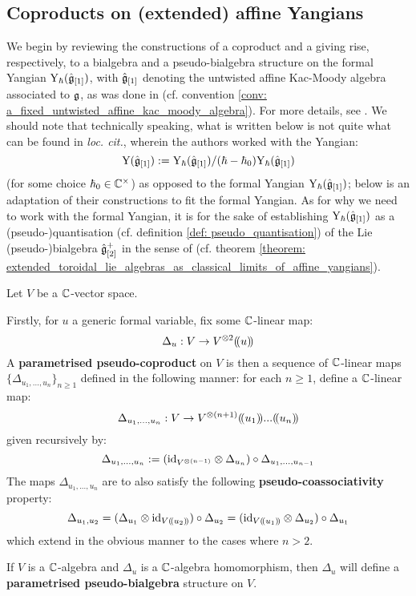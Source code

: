         \subsection{Coproducts on (extended) affine Yangians}
            We begin by reviewing the constructions of a coproduct and a  giving rise, respectively, to a bialgebra and a pseudo-bialgebra structure on the formal Yangian $\mathrm{Y}_{\hbar}(\hat{\mathfrak{g}}_{[1]})$, with $\hat{\mathfrak{g}}_{[1]}$ denoting the untwisted affine Kac-Moody algebra associated to $\mathfrak{g}$, as was done in \cite[Cahpter 7]{kac_infinite_dimensional_lie_algebras} (cf. convention \ref{conv: a_fixed_untwisted_affine_kac_moody_algebra}). For more details, see \cite[Sections 4, 5, and 6]{guay_nakajima_wendlandt_affine_yangian_coproduct}. We should note that technically speaking, what is written below is not quite what can be found in \textit{loc. cit.}, wherein the authors worked with the Yangian:
                $$\mathrm{Y}(\hat{\mathfrak{g}}_{[1]}) := \mathrm{Y}_{\hbar}(\hat{\mathfrak{g}}_{[1]})/(\hbar - \hbar_0)\mathrm{Y}_{\hbar}(\hat{\mathfrak{g}}_{[1]})$$
            (for some choice $\hbar_0 \in \bbC^{\x}$) as opposed to the formal Yangian $\mathrm{Y}_{\hbar}(\hat{\mathfrak{g}}_{[1]})$; below is an adaptation of their constructions to fit the formal Yangian. As for why we need to work with the formal Yangian, it is for the sake of establishing $\mathrm{Y}_{\hbar}(\hat{\mathfrak{g}}_{[1]})$ as a (pseudo-)quantisation (cf. definition \ref{def: pseudo_quantisation}) of the Lie (pseudo-)bialgebra $\hat{\mathfrak{g}}_{[2]}^+$ in the sense of \cite{etingof_kazhdan_quantisation_1} (cf. theorem \ref{theorem: extended_toroidal_lie_algebras_as_classical_limits_of_affine_yangians}). 
        
            \begin{definition} \label{def: parametrised_pseudo_coproducts}
                Let $V$ be a $\mathbb{C}$-vector space. 

                Firstly, for $u$ a generic formal variable, fix some $\mathbb{C}$-linear map:
                    $$\Delta_u: V \to V^{\tensor 2}(\!(u)\!)$$
                A \textbf{parametrised pseudo-coproduct} on $V$ is then a sequence of $\mathbb{C}$-linear maps $\{\Delta_{u_1, ..., u_n}\}_{n \geq 1}$ defined in the following manner: for each $n \geq 1$, define a $\mathbb{C}$-linear map:
                    $$\Delta_{u_1, ..., u_n}: V \to V^{\tensor (n + 1)}(\!(u_1)\!) ... (\!(u_n)\!)$$
                given recursively by:
                    $$\Delta_{u_1, ..., u_n} := ( \id_{ V^{\tensor (n - 1)} } \tensor \Delta_{u_n} ) \circ \Delta_{u_1, ..., u_{n - 1}}$$
                The maps $\Delta_{u_1, ..., u_n}$ are to also satisfy the following \textbf{pseudo-coassociativity} property:
                    $$\Delta_{u_1, u_2} = ( \Delta_{u_1} \tensor \id_{V(\!(u_2)\!)} ) \circ \Delta_{u_2} = ( \id_{V(\!(u_1)\!)} \tensor \Delta_{u_2} ) \circ \Delta_{u_1}$$
                which extend in the obvious manner to the cases where $n > 2$. 

                If $V$ is a $\mathbb{C}$-algebra and $\Delta_u$ is a $\mathbb{C}$-algebra homomorphism, then $\Delta_u$ will define a \textbf{parametrised pseudo-bialgebra} structure on $V$.
            \end{definition}
            
